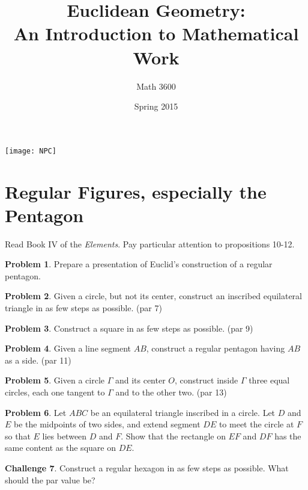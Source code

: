 \documentclass{tufte-handout}
\title{Euclidean Geometry:\\An Introduction to Mathematical Work}
\author[]{Math 3600}
\date{Spring 2015}
\theoremstyle{definition}
\newtheorem{problem}{Problem}[section]
\newtheorem{challenge}[problem]{Challenge}
\begin{document}
\maketitle

\begin{marginfigure}
    \texttt{[image: NPC]}
\end{marginfigure}

\setcounter{section}{15}
\section{Regular Figures, especially the Pentagon}

Read Book IV of the \emph{Elements}. Pay particular attention to propositions 10-12.

\begin{problem}\label{prob:GSP-reg-pentagon}
Prepare a presentation of Euclid's construction of a regular pentagon.
\end{problem}

\begin{problem}\label{prob:circle-inscribe-triangle} Given a circle, but not its center, construct an inscribed equilateral triangle in as few steps as possible. (par 7)
\end{problem}

\begin{problem}\label{prob:square}
Construct a square in as few steps as possible. (par 9)
\end{problem}

\begin{problem}\label{prob:side-reg-pent}
Given a line segment $AB$, construct a regular pentagon having $AB$ as a side. (par 11)
\end{problem}

\begin{problem}\label{prob:circle-three-tangent-circles}
Given a circle $\Gamma$ and its center $O$, construct inside $\Gamma$ three equal circles, each one tangent to $\Gamma$ and to the other two. (par 13)
\end{problem}

\begin{problem}\label{prob:inscribed-circle-content}
Let $ABC$ be an equilateral triangle inscribed in a circle. Let $D$ and $E$ be the midpoints of two sides, and extend segment $DE$ to meet the circle at $F$ so that $E$ lies between $D$ and $F$. Show that the rectangle on $EF$ and $DF$ has the same content as the square on $DE$.
\end{problem}


\begin{challenge}\label{chal:hexagon}
Construct a regular hexagon in as few steps as possible. What should the par value be?
\end{challenge}

\vfill
\end{document}
